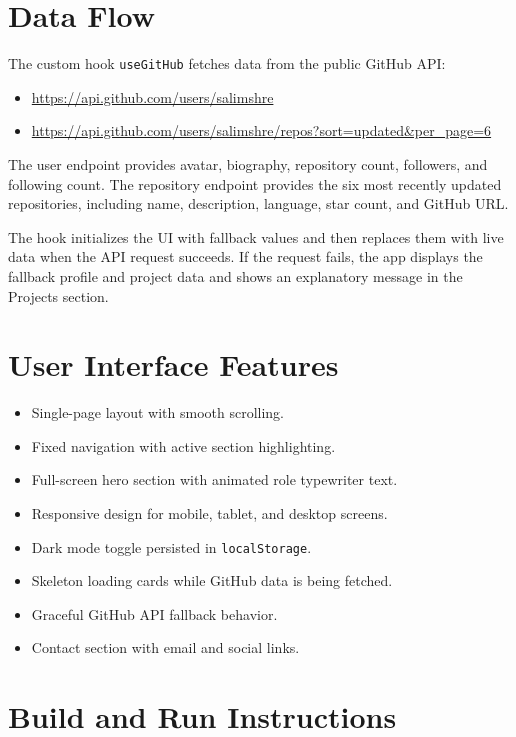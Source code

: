 \documentclass[12pt,a4paper]{article}
\newcommand{\code}[1]{\colorbox{CodeBg}{\texttt{#1}}}
\begin{document}
\section{Data Flow}

The custom hook \code{useGitHub} fetches data from the public GitHub API:

\begin{itemize}
  \item \url{https://api.github.com/users/salimshre}
  \item \url{https://api.github.com/users/salimshre/repos?sort=updated&per_page=6}
\end{itemize}

The user endpoint provides avatar, biography, repository count, followers,
and following count. The repository endpoint provides the six most recently
updated repositories, including name, description, language, star count, and
GitHub URL.

The hook initializes the UI with fallback values and then replaces them with
live data when the API request succeeds. If the request fails, the app displays
the fallback profile and project data and shows an explanatory message in the
Projects section.

\section{User Interface Features}

\begin{itemize}
  \item Single-page layout with smooth scrolling.
  \item Fixed navigation with active section highlighting.
  \item Full-screen hero section with animated role typewriter text.
  \item Responsive design for mobile, tablet, and desktop screens.
  \item Dark mode toggle persisted in \code{localStorage}.
  \item Skeleton loading cards while GitHub data is being fetched.
  \item Graceful GitHub API fallback behavior.
  \item Contact section with email and social links.
\end{itemize}

\section{Build and Run Instructions}
\end{document}
